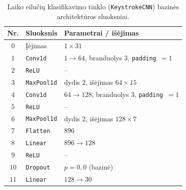 \begin{table}[H]
    \centering
    \caption{Laiko eilučių klasifikavimo tinklo (\texttt{KeystrokeCNN}) bazinės architektūros sluoksniai.}
    \begin{tabular}{|c|l|l|}
        \hline
        Nr. & Sluoksnis & Parametrai / išėjimas \\
        \hline
        $0$ & Įėjimas & $1 \times 31$ \\ \hline
        $1$ & \texttt{Conv1d} & $1 \to 64$, branduolys $3$, \texttt{padding}~$=1$ \\ \hline
        $2$ & \texttt{ReLU} & – \\ \hline
        $3$ & \texttt{MaxPool1d} & dydis $2$, išėjimas $64 \times 15$ \\ \hline
        $4$ & \texttt{Conv1d} & $64 \to 128$, branduolys $3$, \texttt{padding}~$=1$ \\ \hline
        $5$ & \texttt{ReLU} & – \\ \hline
        $6$ & \texttt{MaxPool1d} & dydis $2$, išėjimas $128 \times 7$ \\ \hline
        $7$ & \texttt{Flatten} & $896$ \\ \hline
        $8$ & \texttt{Linear} & $896 \to 128$ \\ \hline
        $9$ & \texttt{ReLU} & – \\ \hline
        $10$ & \texttt{Dropout} & $p = 0{,}0$ (bazinė) \\ \hline
        $11$ & \texttt{Linear} & $128 \to 30$ \\ \hline
    \end{tabular}
    \label{tab:keystroke_cnn_architecture}
\end{table}
